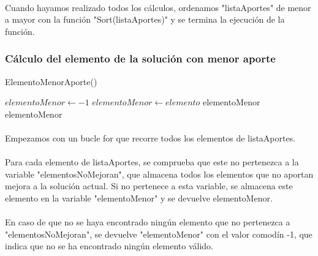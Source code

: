\documentclass{article}
\begin{document}
	\paragraph{}Cuando hayamos realizado todos los cálculos, ordenamos "listaAportes" de menor a mayor con la función "Sort(listaAportes)" y se termina la ejecución de la función.
	
	\subsubsection{Cálculo del elemento de la solución con menor aporte}
	\begin{algorithm}[H]
		\caption{ElementoMenorAporte()}
		\begin{algorithmic}
			\STATE $elementoMenor \leftarrow -1$
			\STATE $elementoMenor \leftarrow elemento$
			\RETURN elementoMenor
			\ENDIF
			\ENDFOR
			\RETURN elementoMenor
		\end{algorithmic}
	\end{algorithm}
	
	\paragraph{}Empezamos con un bucle for que recorre todos los elementos de listaAportes.
	
	\paragraph{}Para cada elemento de listaAportes, se comprueba que este no pertenezca a la variable "elementosNoMejoran", que almacena todos los elementos que no aportan mejora a la solución actual. Si no pertenece a esta variable, se almacena este elemento en la variable "elementoMenor" y se devuelve elementoMenor.
	
	\paragraph{}En caso de que no se haya encontrado ningún elemento que no pertenezca a "elementosNoMejoran", se devuelve "elementoMenor" con el valor comodín -1, que indica que no se ha encontrado ningún elemento válido.
	
\end{document}
